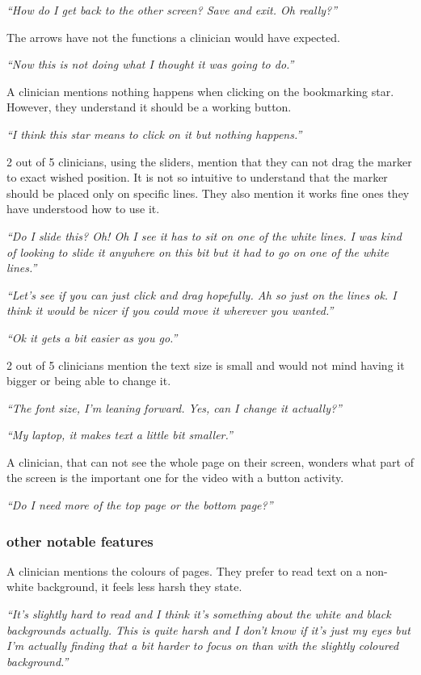 \documentclass{sigchi}
\begin{document}
\textit{“How do I get back to the other screen? Save and exit. Oh really?”}

The arrows have not the functions a clinician would have expected.

\textit{“Now this is not doing what I thought it was going to do.”}

A clinician mentions nothing happens when clicking on the bookmarking star. However, they understand it should be a working button.

\textit{“I think this star means to click on it but nothing happens.”}

2 out of 5 clinicians, using the sliders, mention that they can not drag the marker to exact wished position. It is not so intuitive to understand that the marker should be placed only on specific lines. They also mention it works fine ones they have understood how to use it.

\textit{“Do I slide this? Oh! Oh I see it has to sit on one of the white lines. I was kind of looking to slide it anywhere on this bit but it had to go on one of the white lines.”}

\textit{“Let’s see if you can just click and drag hopefully. Ah so just on the lines ok. I think it would be nicer if you could move it wherever you wanted.”}

\textit{“Ok it gets a bit easier as you go.”}

2 out of 5 clinicians mention the text size is small and would not mind having it bigger or being able to change it.

\textit{“The font size, I’m leaning forward. Yes, can I change it actually?”}

\textit{“My laptop, it makes text a little bit smaller.”}

A clinician, that can not see the whole page on their screen, wonders what part of the screen is the important one for the video with a button activity.

\textit{“Do I need more of the top page or the bottom page?”}

\subsubsection{other notable features}
A clinician mentions the colours of pages. They prefer to read text on a non-white background, it feels less harsh they state.

\textit{“It’s slightly hard to read and I think it’s something about the white and black backgrounds actually. This is quite harsh and I don’t know if it’s just my eyes but I’m actually finding that a bit harder to focus on than with the slightly coloured background.”}
\end{document}
